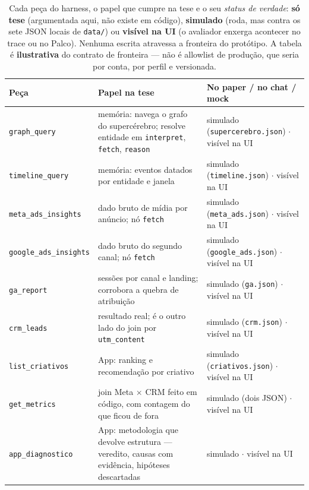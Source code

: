 \documentclass[10pt,twocolumn]{article}
\newcommand{\code}[1]{\texttt{\footnotesize #1}}
\begin{document}
\begin{table}[t]
\centering
\scriptsize
\caption{Cada peça do harness, o papel que cumpre na tese e o seu \emph{status de verdade}:
\textbf{só tese} (argumentada aqui, não existe em código), \textbf{simulado} (roda, mas
contra os sete JSON locais de \code{data/}) ou \textbf{visível na UI} (o avaliador enxerga
acontecer no trace ou no Palco). Nenhuma escrita atravessa a fronteira do protótipo. A
tabela é \textbf{ilustrativa} do contrato de fronteira --- não é allowlist de produção, que
seria por conta, por perfil e versionada.}
\label{tab:pecas}
\setlength{\tabcolsep}{5pt}
\begin{tabular}{@{}>{\raggedright\arraybackslash}p{32mm}>{\raggedright\arraybackslash}p{70mm}>{\raggedright\arraybackslash}p{61mm}@{}}
\toprule
\textbf{Peça} & \textbf{Papel na tese} & \textbf{No paper / no chat / mock} \\
\midrule
\code{graph\_query}          & memória: navega o grafo do supercérebro; resolve entidade em \code{interpret}, \code{fetch}, \code{reason} & simulado (\code{supercerebro.json}) $\cdot$ visível na UI \\
\code{timeline\_query}       & memória: eventos datados por entidade e janela & simulado (\code{timeline.json}) $\cdot$ visível na UI \\
\code{meta\_ads\_insights}   & dado bruto de mídia por anúncio; nó \code{fetch} & simulado (\code{meta\_ads.json}) $\cdot$ visível na UI \\
\code{google\_ads\_insights} & dado bruto do segundo canal; nó \code{fetch} & simulado (\code{google\_ads.json}) $\cdot$ visível na UI \\
\code{ga\_report}            & sessões por canal e landing; corrobora a quebra de atribuição & simulado (\code{ga.json}) $\cdot$ visível na UI \\
\code{crm\_leads}            & resultado real; é o outro lado do join por \code{utm\_content} & simulado (\code{crm.json}) $\cdot$ visível na UI \\
\code{list\_criativos}       & App: ranking e recomendação por criativo & simulado (\code{criativos.json}) $\cdot$ visível na UI \\
\code{get\_metrics}          & join Meta $\times$ CRM feito em código, com contagem do que ficou de fora & simulado (dois JSON) $\cdot$ visível na UI \\
\code{app\_diagnostico}      & App: metodologia que devolve estrutura --- veredito, causas com evidência, hipóteses descartadas & simulado $\cdot$ visível na UI \\

\end{tabular}
\end{table}
\end{document}
